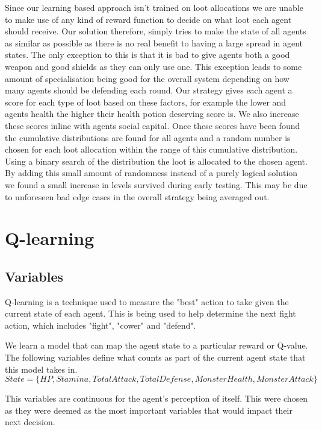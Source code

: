Since our learning based approach isn't trained on loot allocations we are unable to make use of any kind of reward function to decide on what loot each agent should receive. Our solution therefore, simply tries to make the state of all agents as similar as possible as there is no real benefit to having a large spread in agent states. The only exception to this is that it is bad to give agents both a good weapon and good shields as they can only use one. This exception leads to some amount of specialisation being good for the overall system depending on how many agents should be defending each round. Our strategy gives each agent a score for each type of loot based on these factors, for example the lower and agents health the higher their health potion deserving score is. We also increase these scores inline with agents social capital. Once these scores have been found the cumulative distributions are found for all agents and a random number is chosen for each loot allocation within the range of this cumulative distribution. Using a binary search of the distribution the loot is allocated to the chosen agent. By adding this small amount of randomness instead of a purely logical solution we found a small increase in levels survived during early testing. This may be due to unforeseen bad edge cases in the overall strategy being averaged out.


\section{Q-learning}
\subsection{Variables}
Q-learning \cite{qlearn} is a technique used to measure the "best" action to take given the current state of each agent. This is being used to help determine the next fight action, which includes "fight", "cower" and "defend". 

We learn a model that can map the agent state to a particular reward or Q-value. The following variables define what counts as part of the current agent state that this model takes in.
\begin{equation}
    State = \{HP, Stamina, TotalAttack, TotalDefense, MonsterHealth, MonsterAttack \}
\end{equation}

This variables are continuous for the agent's perception of itself. This were chosen as they were deemed as the most important variables that would impact their next decision. 

